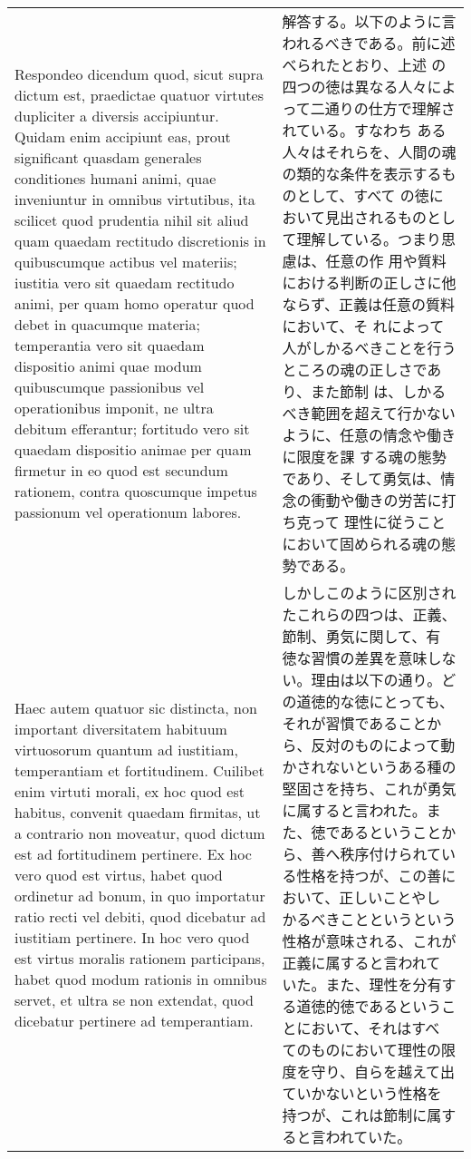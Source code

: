\documentclass[10pt]{jsarticle}
\begin{document}
\begin{longtable}{p{21em}p{21em}}
 Respondeo dicendum quod, sicut supra dictum est, praedictae quatuor
 virtutes dupliciter a diversis accipiuntur. Quidam enim accipiunt
 eas, prout significant quasdam generales conditiones humani animi,
 quae inveniuntur in omnibus virtutibus, ita scilicet quod prudentia
 nihil sit aliud quam quaedam rectitudo discretionis in quibuscumque
 actibus vel materiis; iustitia vero sit quaedam rectitudo animi, per
 quam homo operatur quod debet in quacumque materia; temperantia vero
 sit quaedam dispositio animi quae modum quibuscumque passionibus vel
 operationibus imponit, ne ultra debitum efferantur; fortitudo vero
 sit quaedam dispositio animae per quam firmetur in eo quod est
 secundum rationem, contra quoscumque impetus passionum vel
 operationum labores.


&

 解答する。以下のように言われるべきである。前に述べられたとおり、上述
 の四つの徳は異なる人々によって二通りの仕方で理解されている。すなわち
 ある人々はそれらを、人間の魂の類的な条件を表示するものとして、すべて
 の徳において見出されるものとして理解している。つまり思慮は、任意の作
 用や質料における判断の正しさに他ならず、正義は任意の質料において、そ
 れによって人がしかるべきことを行うところの魂の正しさであり、また節制
 は、しかるべき範囲を超えて行かないように、任意の情念や働きに限度を課
 する魂の態勢であり、そして勇気は、情念の衝動や働きの労苦に打ち克って
 理性に従うことにおいて固められる魂の態勢である。
 
 

 
\\



 Haec autem quatuor sic distincta, non important diversitatem habituum
 virtuosorum quantum ad iustitiam, temperantiam et
 fortitudinem. Cuilibet enim virtuti morali, ex hoc quod est habitus,
 convenit quaedam firmitas, ut a contrario non moveatur, quod dictum
 est ad fortitudinem pertinere. Ex hoc vero quod est virtus, habet
 quod ordinetur ad bonum, in quo importatur ratio recti vel debiti,
 quod dicebatur ad iustitiam pertinere. In hoc vero quod est virtus
 moralis rationem participans, habet quod modum rationis in omnibus
 servet, et ultra se non extendat, quod dicebatur pertinere ad
 temperantiam.


&

しかしこのように区別されたこれらの四つは、正義、節制、勇気に関して、有
徳な習慣の差異を意味しない。理由は以下の通り。どの道徳的な徳にとっても、
それが習慣であることから、反対のものによって動かされないというある種の
堅固さを持ち、これが勇気に属すると言われた。また、徳であるということか
ら、善へ秩序付けられている性格を持つが、この善において、正しいことやし
かるべきことというという性格が意味される、これが正義に属すると言われて
いた。また、理性を分有する道徳的徳であるということにおいて、それはすべ
てのものにおいて理性の限度を守り、自らを越えて出ていかないという性格を
持つが、これは節制に属すると言われていた。
 

\end{longtable}
\end{document}
